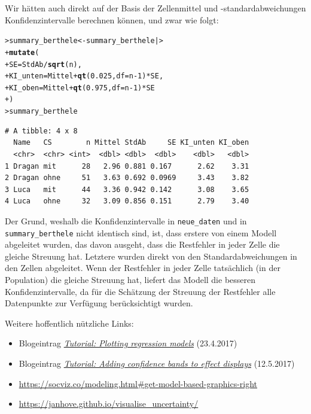 \documentclass[oneside, 10pt]{book}\usepackage[]{graphicx}\usepackage[]{xcolor}
\makeatletter
\newcommand{\hlnum}[1]{\textcolor[rgb]{0.686,0.059,0.569}{#1}}%
\newcommand{\hlopt}[1]{\textcolor[rgb]{0,0,0}{#1}}%
\newcommand{\hlstd}[1]{\textcolor[rgb]{0.345,0.345,0.345}{#1}}%
\newcommand{\hlkwb}[1]{\textcolor[rgb]{0.69,0.353,0.396}{#1}}%
\newcommand{\hlkwc}[1]{\textcolor[rgb]{0.333,0.667,0.333}{#1}}%
\newcommand{\hlkwd}[1]{\textcolor[rgb]{0.737,0.353,0.396}{\textbf{#1}}}%
\newenvironment{kframe}{%
 \def\at@end@of@kframe{}%
 \ifinner\ifhmode%
  \def\at@end@of@kframe{\end{minipage}}%
  \begin{minipage}{\columnwidth}%
 \fi\fi%
 \def\FrameCommand##1{\hskip\@totalleftmargin \hskip-\fboxsep
 \colorbox{shadecolor}{##1}\hskip-\fboxsep
     \hskip-\linewidth \hskip-\@totalleftmargin \hskip\columnwidth}%
 \MakeFramed {\advance\hsize-\width
   \@totalleftmargin\z@ \linewidth\hsize
   \@setminipage}}%
 {\par\unskip\endMakeFramed%
 \at@end@of@kframe}
\newenvironment{knitrout}{}{} %
\makeatother
\begin{document}
Wir hätten auch direkt auf der Basis der Zellenmittel und -standard\-ab\-weichungen
Konfidenzintervalle berechnen können, und zwar wie folgt:
\begin{knitrout}
\color{fgcolor}\begin{kframe}
\begin{alltt}
\hlstd{> }\hlstd{summary_berthele} \hlkwb{<-} \hlstd{summary_berthele |>}
\hlstd{+ }  \hlkwd{mutate}\hlstd{(}
\hlstd{+ }    \hlkwc{SE} \hlstd{= StdAb} \hlopt{/} \hlkwd{sqrt}\hlstd{(n),}
\hlstd{+ }    \hlkwc{KI_unten} \hlstd{= Mittel} \hlopt{+} \hlkwd{qt}\hlstd{(}\hlnum{0.025}\hlstd{,} \hlkwc{df} \hlstd{= n} \hlopt{-} \hlnum{1}\hlstd{)} \hlopt{*} \hlstd{SE,}
\hlstd{+ }    \hlkwc{KI_oben} \hlstd{= Mittel} \hlopt{+} \hlkwd{qt}\hlstd{(}\hlnum{0.975}\hlstd{,} \hlkwc{df} \hlstd{= n} \hlopt{-} \hlnum{1}\hlstd{)} \hlopt{*} \hlstd{SE}
\hlstd{+ }  \hlstd{)}
\hlstd{> }\hlstd{summary_berthele}
\end{alltt}
\begin{verbatim}
# A tibble: 4 x 8
  Name   CS        n Mittel StdAb     SE KI_unten KI_oben
  <chr>  <chr> <int>  <dbl> <dbl>  <dbl>    <dbl>   <dbl>
1 Dragan mit      28   2.96 0.881 0.167      2.62    3.31
2 Dragan ohne     51   3.63 0.692 0.0969     3.43    3.82
3 Luca   mit      44   3.36 0.942 0.142      3.08    3.65
4 Luca   ohne     32   3.09 0.856 0.151      2.79    3.40
\end{verbatim}
\end{kframe}
\end{knitrout}

Der Grund, weshalb die Konfidenzintervalle in \texttt{neue\_daten}
und in \texttt{summary\_berthele} nicht identisch sind,
ist, dass erstere von einem Modell abgeleitet wurden, das
davon ausgeht, dass die Restfehler in jeder Zelle die gleiche
Streuung hat. Letztere wurden direkt von den Standardabweichungen
in den Zellen abgeleitet. Wenn der Restfehler in jeder Zelle
tatsächlich (in der Population) die gleiche Streuung hat, liefert
das Modell die besseren Konfidenzintervalle, da für die Schätzung
der Streuung der Restfehler alle Datenpunkte zur Verfügung berücksichtigt wurden.

Weitere hoffentlich nützliche Links:
\begin{itemize}
 \item Blogeintrag \href{https://janhove.github.io/reporting/2017/04/23/visualising-models-1}{\textit{Tutorial: Plotting regression models}} (23.4.2017)
 \item Blogeintrag \href{https://janhove.github.io/reporting/2017/05/12/visualising-models-2}{\textit{Tutorial: Adding confidence bands to effect displays}} (12.5.2017)
  \item \url{https://socviz.co/modeling.html#get-model-based-graphics-right}
  \item \url{https://janhove.github.io/visualise_uncertainty/}
\end{itemize}
\end{document}
